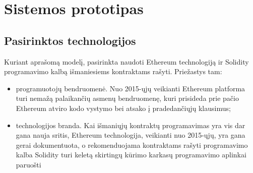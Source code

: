 \section{Sistemos prototipas}

\subsection{Pasirinktos technologijos}

Kuriant aprašomą modelį, pasirinkta naudoti Ethereum technologiją ir Solidity programavimo
kalbą išmaniesiems kontraktams rašyti. Priežastys tam:

\begin{itemize}
    \item programuotojų bendruomenė. Nuo 2015-ųjų veikianti Ethereum platforma turi nemažą
    palaikančių asmenų bendruomenę, kuri prisideda prie pačio Ethereum atviro kodo vystymo
    bei atsako į pradedančiųjų klausimus;
    \item technologijos branda. Kai išmaniųjų kontraktų programavimas yra vis dar gana nauja sritis,
    Ethereum technologija, veikianti nuo 2015-ųjų, yra gana gerai dokumentuota, o rekomenduojama kontraktams rašyti programavimo kalba
    Solidity \cite{Ethereum} turi keletą skirtingų kūrimo karkasų programavimo aplinkai paruošti \cite{SolidityDocumentation}
\end{itemize}